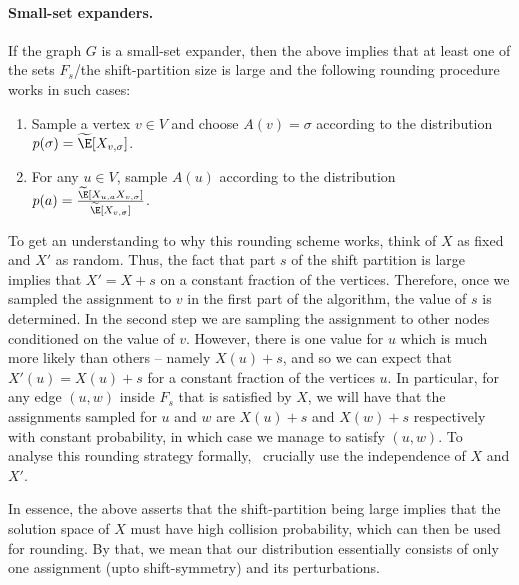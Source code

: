 \paragraph{Small-set expanders.} If the graph 
$G$ is a small-set expander, then the above implies that at
least one of the sets $F_s$/the shift-partition size is large and the following 
rounding procedure works in such cases:
\begin{enumerate}
    \item Sample a vertex $v\in V$ and choose $A(v) = \sigma$ according to the distribution $p(\sigma) = \widetilde{\E}[X_{v,\sigma}]$.
    \item For any $u\in V$, sample $A(u)$ according to the distribution $p(a)=\frac{\widetilde{\E}[X_{u,a}X_{v,\sigma}]}
    {\widetilde{\E}[X_{v,\sigma}]}$.
\end{enumerate}
To get an understanding to why this rounding scheme works, think of $X$ as fixed and $X'$ as random. Thus, the fact that part $s$ of
the shift partition is large implies 
that $X' = X+s$ 
on a constant fraction of the vertices.
Therefore, once we sampled the assignment to $v$ in the first part 
of the algorithm, the value of $s$ is determined. In the second step we are sampling the assignment to other 
nodes conditioned on the value of $v$. However, there is one
value for $u$ which is much more likely than others -- namely 
$X(u)+s$, and so we can expect that $X'(u) = X(u) + s$ for a constant fraction of the vertices $u$. In particular, for any edge $(u,w)$ inside $F_s$ that is satisfied by $X$, we will have that the assignments sampled for $u$ and $w$ are $X(u)+s$ and $X(w) + s$ respectively with constant probability, in which case we manage to satisfy $(u,w)$. To analyse this rounding strategy formally,~\cite{BBKSS} crucially use the independence of $X$ and $X'$. 

In essence, the above asserts that the shift-partition being large implies that the solution space of $X$ must have high collision probability, which can then be used for rounding. By that, we mean that our distribution essentially consists of only one assignment (upto shift-symmetry) and its perturbations.

